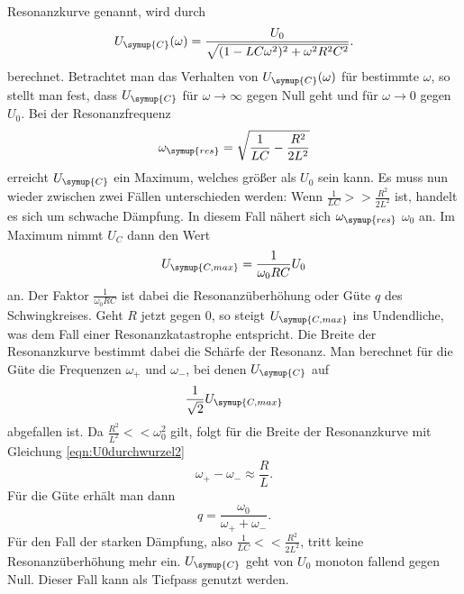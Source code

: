 Resonanzkurve genannt, wird durch
\begin{equation}
  U_\symup{C}(\omega) = \frac{U_0}{\sqrt{(1-L C \omega^2)^2 + \omega^2 R^2 C^2}}.
  \label{eqn:resonanzkurve}
\end{equation}
berechnet. Betrachtet man das Verhalten von $U_\symup{C}(\omega)$ für bestimmte
$\omega$, so stellt man fest, dass $U_\symup{C}$ für $\omega \to \infty$ gegen
Null geht und für $\omega \to 0$ gegen $U_0$. Bei der Resonanzfrequenz
\begin{equation}
  \omega_\symup{res} = \sqrt{\frac{1}{L C}-\frac{R^2}{2L^2}}
  \label{eqn:resonanzfrequenz}
\end{equation}
erreicht $U_\symup{C}$ ein Maximum, welches größer als $U_0$ sein kann.
Es muss nun wieder zwischen zwei Fällen unterschieden werden:\newline
Wenn $\frac{1}{L C} >> \frac{R^2}{2 L^2}$ ist, handelt es sich um schwache Dämpfung.
In diesem Fall nähert sich $\omega_\symup{res}$ $\omega_0$ an. Im Maximum nimmt
$U_C$ dann den Wert
\begin{equation}
  U_\symup{C,max} = \frac{1}{\omega_0 R C} U_0
  \label{eqn:Ucmax}
\end{equation}
an. Der Faktor $\frac{1}{\omega_0 R C}$ ist dabei die Resonanzüberhöhung oder
Güte $q$ des Schwingkreises. Geht $R$ jetzt gegen 0, so steigt $U_\symup{C,max}$
ins Undendliche, was dem Fall einer Resonanzkatastrophe entspricht.
Die Breite der Resonanzkurve bestimmt dabei die Schärfe der Resonanz. Man berechnet
für die Güte die Frequenzen $\omega_+$ und $\omega_-$, bei denen $U_\symup{C}$ auf
\begin{equation}
  \frac{1}{\sqrt{2}}U_\symup{C,max}
  \label{eqn:U0durchwurzel2}
\end{equation}
abgefallen ist.
Da $\frac{R^2}{L^2} << \omega_0^2$ gilt, folgt für die Breite der Resonanzkurve
mit Gleichung \eqref{eqn:U0durchwurzel2}
\begin{equation}
  \omega_+ - \omega_- \approx \frac{R}{L}.
  \label{eqn:breite_resonanzkurve}
\end{equation}
Für die Güte erhält man dann
\begin{equation}
  q = \frac{\omega_0}{\omega_+ + \omega_-}.
  \label{eqn:guete}
\end{equation}
Für den Fall der starken Dämpfung, also $\frac{1}{L C} << \frac{R^2}{2 L^2}$, tritt
keine Resonanzüberhöhung mehr ein. $U_\symup{C}$ geht von $U_0$ monoton fallend
gegen Null. Dieser Fall kann als Tiefpass genutzt werden.
\cite{sample}
